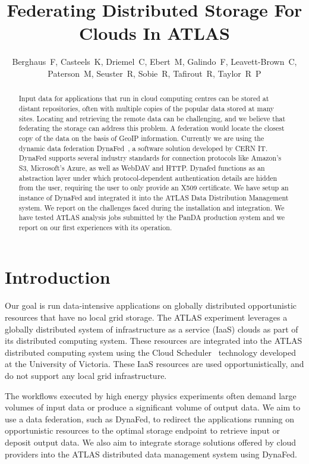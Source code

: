 \documentclass[a4paper]{jpconf}
\begin{document}
\title{Federating Distributed Storage For Clouds In ATLAS}

\author{Berghaus~F, Casteels~K, Driemel~C, Ebert~M, Galindo~F, Leavett-Brown~C, Paterson~M, Seuster~R, Sobie~R, Tafirout~R, Taylor~R~P}

\address{Frank~Berghaus, G07810, CERN, CH-1211 Geneva 23,  Switzerland}


\begin{abstract}
Input data for applications that run in cloud computing centres can be stored at distant repositories, often with multiple copies of the popular data stored at many sites. Locating and retrieving the remote data can be challenging, and we believe that federating the storage can address this problem. A federation would locate the closest copy of the data on the basis of GeoIP information. Currently we are using the dynamic data federation DynaFed~\cite{dynafed}, a software solution developed by CERN IT. DynaFed supports several industry standards for connection protocols like Amazon's S3, Microsoft's Azure, as well as WebDAV and HTTP. Dynafed functions as an abstraction layer under which protocol-dependent authentication details are  hidden from the user, requiring the user to only provide an X509 certificate. We have setup an instance of DynaFed and integrated it into the ATLAS Data Distribution Management system. We report on the challenges faced during the installation and integration. We have tested ATLAS analysis jobs submitted by the PanDA production system and we report on our first experiences with its operation.
\end{abstract}

\section{Introduction}
Our goal is run data-intensive applications on globally distributed opportunistic resources that have no local grid storage. The ATLAS experiment leverages a globally distributed system of infrastructure as a service (IaaS) clouds as part of its distributed computing system. These resources are integrated into the ATLAS distributed computing system using the Cloud Scheduler~\cite{cloud-scheduler} technology developed at the University of Victoria. These IaaS resources are used opportunistically, and do not support any local grid infrastructure.

The workflows executed by high energy physics experiments often demand large volumes of input data or produce a significant volume of output data. We aim to use a data federation, such as DynaFed, to redirect the applications running on opportunistic resources to the optimal storage endpoint to retrieve input or deposit output data. We also aim to integrate storage solutions offered by cloud providers into the ATLAS distributed data management system using DynaFed.
\end{document}
